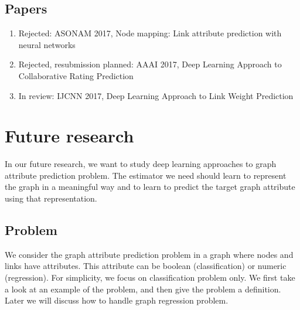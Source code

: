 \documentclass{article}
\begin{document}
\subsection{Papers}
\begin{enumerate}
	\item Rejected: ASONAM 2017, Node mapping: Link attribute prediction with neural networks
	\item Rejected, resubmission planned: AAAI 2017, Deep Learning Approach to Collaborative Rating Prediction
	\item In review: IJCNN 2017, Deep Learning Approach to Link Weight Prediction
\end{enumerate}

\section{Future research}
In our future research,
we want to study deep learning approaches to graph attribute prediction problem.
The estimator we need should learn to represent the graph in a meaningful way
and to learn to predict the target graph attribute using that representation.

\subsection{Problem}
We consider the graph attribute prediction problem
in a graph where nodes and links have attributes.
This attribute can be boolean (classification) or numeric (regression).
For simplicity, we focus on classification problem only.
We first take a look at an example of the problem,
and then give the problem a definition.
Later we will discuss how to handle graph regression problem.
\end{document}
